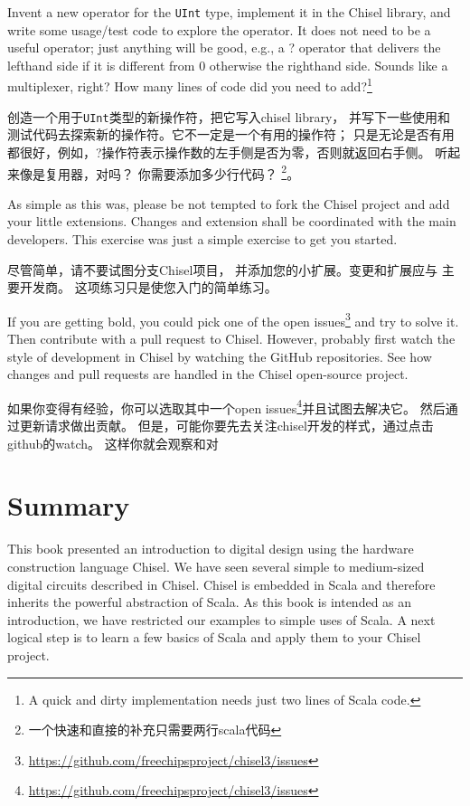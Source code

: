 \documentclass[%
    10pt,
    headinclude, footexclude,
    openright, %
    notitlepage,
    cleardoubleempty,
    headsepline,
    pointlessnumbers,
    bibtotoc, idxtotoc,
    ]{scrbook}
\newcommand{\code}[1]{{\small{\texttt{#1}}}}
\newcommand{\myref}[2]{\href{#1}{#2}}
\renewcommand{\myref}[2]{{#2}{\footnote{\url{#1}}}}
\begin{document}
{{Invent a new operator for the \code{UInt} type, implement it in the Chisel library,
and write some usage/test code to explore the operator. It does not need to be
a useful operator; just anything will be good, e.g., a ? operator that delivers the lefthand side
if it is different from 0 otherwise the righthand side. Sounds like a multiplexer, right?
How many lines of code did you need to add?\footnote{A quick and dirty implementation
needs just two lines of Scala code.}

创造一个用于\code{UInt}类型的新操作符，把它写入chisel library，
并写下一些使用和测试代码去探索新的操作符。它不一定是一个有用的操作符；
只是无论是否有用都很好，例如，?操作符表示操作数的左手侧是否为零，否则就返回右手侧。
听起来像是复用器，对吗？
你需要添加多少行代码？
\footnote{一个快速和直接的补充只需要两行scala代码}。


As simple as this was, please be not tempted to fork the Chisel project and
add your little extensions. Changes and extension shall be coordinated with the
main developers.
This exercise was just a simple exercise to get you started.


尽管简单，请不要试图分支Chisel项目，
并添加您的小扩展。变更和扩展应与
主要开发商。
这项练习只是使您入门的简单练习。

If you are getting bold, you could pick one of the
\myref{https://github.com/freechipsproject/chisel3/issues}{open issues} and try to solve it.
Then contribute with a pull request to Chisel.
However, probably first watch the style of development in Chisel by watching the GitHub
repositories.
See how changes and pull requests are handled in the Chisel open-source project.

如果你变得有经验，你可以选取其中一个\myref{https://github.com/freechipsproject/chisel3/issues}{open issues}并且试图去解决它。
然后通过更新请求做出贡献。
但是，可能你要先去关注chisel开发的样式，通过点击github的watch。
这样你就会观察和对


\chapter{Summary}
\label{sec:conclusion}

This book presented an introduction to digital design using the
hardware construction language Chisel.
We have seen several simple to medium-sized digital circuits
described in Chisel.
Chisel is embedded in Scala and therefore inherits the powerful
abstraction of Scala.
As this book is intended as an introduction, we have restricted
our examples to simple uses of Scala.
A next logical step is to learn a few basics of Scala and apply them
to your Chisel project.

}}
\end{document}
